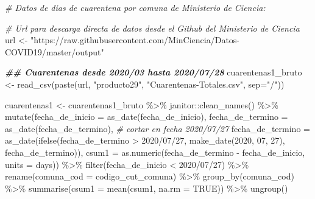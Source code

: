 \documentclass[
  12pt,
]{book}
\newenvironment{Shaded}{\begin{snugshade}}{\end{snugshade}}
\newcommand{\AttributeTok}[1]{\textcolor[rgb]{0.77,0.63,0.00}{#1}}
\newcommand{\CommentTok}[1]{\textcolor[rgb]{0.56,0.35,0.01}{\textit{#1}}}
\newcommand{\ConstantTok}[1]{\textcolor[rgb]{0.00,0.00,0.00}{#1}}
\newcommand{\DecValTok}[1]{\textcolor[rgb]{0.00,0.00,0.81}{#1}}
\newcommand{\DocumentationTok}[1]{\textcolor[rgb]{0.56,0.35,0.01}{\textbf{\textit{#1}}}}
\newcommand{\FunctionTok}[1]{\textcolor[rgb]{0.00,0.00,0.00}{#1}}
\newcommand{\NormalTok}[1]{#1}
\newcommand{\OtherTok}[1]{\textcolor[rgb]{0.56,0.35,0.01}{#1}}
\newcommand{\SpecialCharTok}[1]{\textcolor[rgb]{0.00,0.00,0.00}{#1}}
\newcommand{\StringTok}[1]{\textcolor[rgb]{0.31,0.60,0.02}{#1}}
\begin{document}
\begin{Shaded}
\begin{Highlighting}[]
\CommentTok{\# Datos de dias de cuarentena por comuna de Ministerio de Ciencia:}

\CommentTok{\# Url para descarga directa de datos desde el Github del Ministerio de Ciencia}
\NormalTok{url }\OtherTok{\textless{}{-}} \StringTok{"https://raw.githubusercontent.com/MinCiencia/Datos{-}COVID19/master/output"}

\DocumentationTok{\#\# Cuarentenas desde 2020/03 hasta 2020/07/28 }
\NormalTok{cuarentenas1\_bruto }\OtherTok{\textless{}{-}} \FunctionTok{read\_csv}\NormalTok{(}\FunctionTok{paste}\NormalTok{(url, }\StringTok{"producto29"}\NormalTok{, }\StringTok{"Cuarentenas{-}Totales.csv"}\NormalTok{, }\AttributeTok{sep=}\StringTok{"/"}\NormalTok{))}

\NormalTok{cuarentenas1 }\OtherTok{\textless{}{-}}\NormalTok{ cuarentenas1\_bruto }\SpecialCharTok{\%\textgreater{}\%} 
\NormalTok{  janitor}\SpecialCharTok{::}\FunctionTok{clean\_names}\NormalTok{() }\SpecialCharTok{\%\textgreater{}\%} 
  \FunctionTok{mutate}\NormalTok{(}\AttributeTok{fecha\_de\_inicio =} \FunctionTok{as\_date}\NormalTok{(fecha\_de\_inicio),}
         \AttributeTok{fecha\_de\_termino =} \FunctionTok{as\_date}\NormalTok{(fecha\_de\_termino),}
         \CommentTok{\# cortar en fecha 2020/07/27 }
         \AttributeTok{fecha\_de\_termino =} \FunctionTok{as\_date}\NormalTok{(}\FunctionTok{ifelse}\NormalTok{(fecha\_de\_termino }\SpecialCharTok{\textgreater{}} \StringTok{\textquotesingle{}2020/07/27\textquotesingle{}}\NormalTok{, }
                                           \FunctionTok{make\_date}\NormalTok{(}\DecValTok{2020}\NormalTok{, }\DecValTok{07}\NormalTok{, }\DecValTok{27}\NormalTok{),}
\NormalTok{                                           fecha\_de\_termino)),}
         \AttributeTok{csum1 =} \FunctionTok{as.numeric}\NormalTok{(fecha\_de\_termino }\SpecialCharTok{{-}}\NormalTok{ fecha\_de\_inicio, }\AttributeTok{units =} \StringTok{\textquotesingle{}days\textquotesingle{}}\NormalTok{)) }\SpecialCharTok{\%\textgreater{}\%} 
  \FunctionTok{filter}\NormalTok{(fecha\_de\_inicio }\SpecialCharTok{\textless{}} \StringTok{\textquotesingle{}2020/07/27\textquotesingle{}}\NormalTok{) }\SpecialCharTok{\%\textgreater{}\%} 
  \FunctionTok{rename}\NormalTok{(}\AttributeTok{comuna\_cod =}\NormalTok{ codigo\_cut\_comuna) }\SpecialCharTok{\%\textgreater{}\%}
  \FunctionTok{group\_by}\NormalTok{(comuna\_cod) }\SpecialCharTok{\%\textgreater{}\%} 
  \FunctionTok{summarise}\NormalTok{(}\AttributeTok{csum1 =} \FunctionTok{mean}\NormalTok{(csum1, }\AttributeTok{na.rm =} \ConstantTok{TRUE}\NormalTok{)) }\SpecialCharTok{\%\textgreater{}\%} 
  \FunctionTok{ungroup}\NormalTok{()}


\end{Highlighting}
\end{Shaded}
\end{document}
